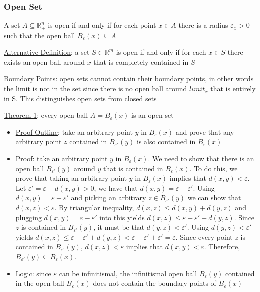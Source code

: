 \documentclass{article}
\begin{document}
\subsubsection{Open Set}
A set $A \subseteq \mathbb{R}_{+}^{n}$ is open if and only if for each point $x \in A$ there is a radius $\varepsilon_{x} > 0$ such that the open ball $B_{\varepsilon}(x) \subseteq A$ \par \vspace{0.3em}
  \underline{Alternative Definition}: a set $S \in \mathbb{R}^{m}$ is open if and only if for each $x \in S$ there exists an open ball around $x$ that is completely contained in $S$ \par
  \underline{Boundary Points}: open sets cannot contain their boundary points, in other words the limit is not in the set since there is no open ball around $limit_{x}$ that is entirely in S. This distinguishes open sets from closed sets \par
  \underline{Theorem 1}: every open ball $A = B_{\varepsilon}(x)$ is an open set
  \begin{itemize}
    \item  \underline{Proof Outline}: take an arbitrary point $y$ in $B_{\varepsilon}(x)$ and prove that any arbitrary point $z$ contained in $B_{\varepsilon'}(y)$ is also contained in $B_{\varepsilon}(x)$
    \item  \underline{Proof}: take an arbitrary point $y$ in $B_{\varepsilon}(x)$. We need to show that there is an open ball $B_{\varepsilon'}(y)$ around $y$ that is contained in $B_{\varepsilon}(x)$. To do this, we prove that taking an arbitrary point $y$ in $B_{\varepsilon}(x)$ implies that $d(x,y) < \varepsilon$. Let $\varepsilon' = \varepsilon - d(x,y) > 0$, we have that $d(x,y) = \varepsilon - \varepsilon'$. Using $d(x,y) = \varepsilon - \varepsilon'$ and picking an arbitrary $z \in B_{\varepsilon'}(y)$ we can show that $d(x,z) < \varepsilon$. By triangular inequality, $d(x,z) \leq d(x,y) + d(y,z)$ and plugging $d(x,y) = \varepsilon - \varepsilon'$ into this yields $d(x,z) \leq \varepsilon - \varepsilon' + d(y,z)$. Since $z$ is contained in $B_{\varepsilon'}(y)$, it must be that $d(y,z) < \varepsilon'$. Using $d(y,z) < \varepsilon'$ yields $d(x,z) \leq \varepsilon - \varepsilon' + d(y,z) < \varepsilon - \varepsilon' + \varepsilon' = \varepsilon$. Since every point $z$ is contained in $B_{\varepsilon'}(y)$, $d(x,z) < \varepsilon$ implies that $d(x,y) < \varepsilon$. Therefore, $B_{\varepsilon'}(y) \subseteq B_{\varepsilon}(x)$.
    \item  \underline{Logic}: since $\varepsilon$ can be infinitismal, the infinitismal open ball $B_{\varepsilon}(y)$ contained in the open ball $B_{\varepsilon}(x)$ does not contain the boundary points of $B_{\varepsilon}(x)$
  \end{itemize}
\end{document}
